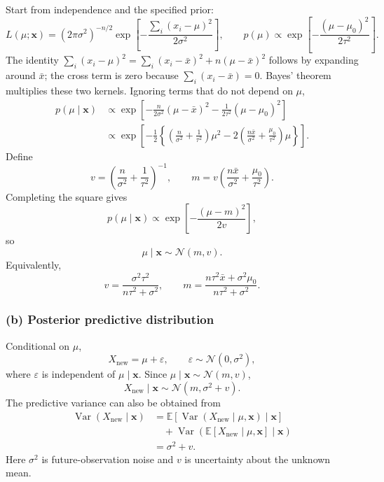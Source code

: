 \documentclass[11pt,a4paper]{article}
\newcommand{\given}{\mathrel{|}}
\newcommand{\xvec}{\boldsymbol{x}}
\newcommand{\E}{\mathbb{E}}
\begin{document}
Start from independence and the specified prior:
\[
L(\mu;\xvec)=(2\pi\sigma^2)^{-n/2}
\exp\left[-\frac{\sum_i(x_i-\mu)^2}{2\sigma^2}\right],
\qquad
p(\mu)\propto\exp\left[-\frac{(\mu-\mu_0)^2}{2\tau^2}\right].
\]
The identity
$\sum_i(x_i-\mu)^2=\sum_i(x_i-\bar x)^2+n(\mu-\bar x)^2$
follows by expanding around $\bar x$; the cross term is zero because
$\sum_i(x_i-\bar x)=0$. Bayes' theorem multiplies these two kernels.
Ignoring terms that do not depend on $\mu$,
\begin{align*}
  p(\mu\given\xvec)
  &\propto
  \exp\left[
    -\frac{n}{2\sigma^2}(\mu-\bar{x})^2
    -\frac{1}{2\tau^2}(\mu-\mu_0)^2
  \right]\\
  &\propto
  \exp\left[
    -\frac12
    \left\{
      \left(\frac{n}{\sigma^2}+\frac{1}{\tau^2}\right)\mu^2
      -2\left(
        \frac{n\bar{x}}{\sigma^2}+\frac{\mu_0}{\tau^2}
      \right)\mu
    \right\}
  \right].
\end{align*}
Define
\[
  v=\left(\frac{n}{\sigma^2}+\frac{1}{\tau^2}\right)^{-1},
  \qquad
  m=v\left(
    \frac{n\bar{x}}{\sigma^2}+\frac{\mu_0}{\tau^2}
  \right).
\]
Completing the square gives
\[
  p(\mu\given\xvec)
  \propto
  \exp\left[-\frac{(\mu-m)^2}{2v}\right],
\]
so
\[
  \boxed{\mu\given\xvec\sim\mathcal{N}(m,v)}.
\]
Equivalently,
\[
  v=\frac{\sigma^2\tau^2}{n\tau^2+\sigma^2},
  \qquad
  m=\frac{n\tau^2\bar{x}+\sigma^2\mu_0}
          {n\tau^2+\sigma^2}.
\]

\subsubsection*{(b) Posterior predictive distribution}

Conditional on $\mu$,
\[
  X_{\mathrm{new}}=\mu+\varepsilon,
  \qquad
  \varepsilon\sim\mathcal{N}(0,\sigma^2),
\]
where $\varepsilon$ is independent of $\mu\given\xvec$. Since
$\mu\given\xvec\sim\mathcal{N}(m,v)$,
\[
  \boxed{
    X_{\mathrm{new}}\given\xvec
    \sim\mathcal{N}(m,\sigma^2+v)
  }.
\]
The predictive variance can also be obtained from
\begin{align*}
  \operatorname{Var}(X_{\mathrm{new}}\given\xvec)
  &=
  \E\!\left[
    \operatorname{Var}(X_{\mathrm{new}}\given\mu,\xvec)
    \given\xvec
  \right]\\
  &\quad+
  \operatorname{Var}\!\left(
    \E[X_{\mathrm{new}}\given\mu,\xvec]
    \given\xvec
  \right)\\
  &=\sigma^2+v.
\end{align*}
Here $\sigma^2$ is future-observation noise and $v$ is uncertainty about the
unknown mean.
\end{document}
